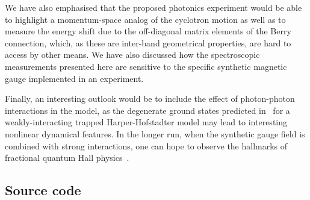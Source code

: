 We have also emphasised that the proposed photonics experiment would
be able to highlight a momentum-space analog of the cyclotron motion
as well as to measure the energy shift due to the off-diagonal matrix
elements of the Berry connection, which, as these are inter-band
geometrical properties, are hard to access by other means. We have
also discussed how the spectroscopic measurements presented here are
sensitive to the specific synthetic magnetic gauge implemented in an
experiment.

Finally, an interesting outlook would be to include the effect of
photon-photon interactions in the model, as the degenerate ground
states predicted in~\cite{ozawa2014momhh} for a weakly-interacting
trapped Harper-Hofstadter model may lead to interesting nonlinear
dynamical features. In the longer run, when the synthetic gauge field
is combined with strong interactions, one can hope to observe the
hallmarks of fractional quantum Hall
physics~\cite{umucalilar2012fractional,hafezi2013non}.

\begin{subappendices}
  \section{Source code}
  \label{sec:source-code-landau} 
\end{subappendices}

